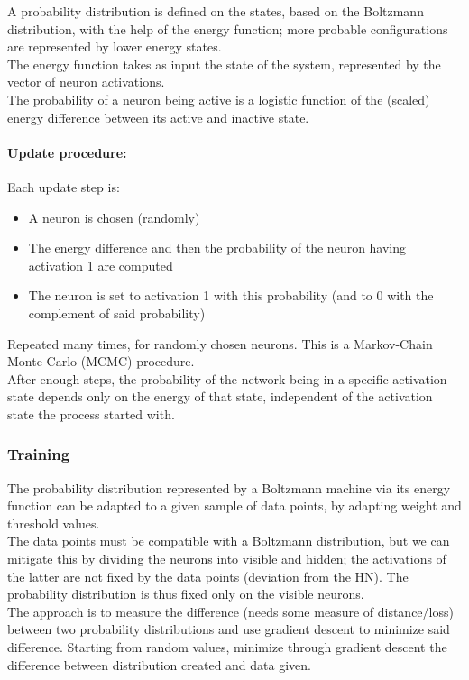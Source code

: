 A probability distribution is defined on the states, based on the Boltzmann distribution, with the help of the energy function; more probable configurations are represented by lower energy states.\\
The energy function takes as input the state of the system, represented by the vector of neuron activations.\\
The probability of a neuron being active is a logistic function of the (scaled) energy difference between its active and inactive state.\\

\paragraph{Update procedure:} Each update step is:
\begin{itemize}
	\item A neuron is chosen (randomly)
	\item The energy difference and then the probability of the neuron having activation 1 are computed
	\item The neuron is set to activation 1 with this probability (and to 0 with the complement of said probability)
\end{itemize}
Repeated many times, for randomly chosen neurons. This is a Markov-Chain Monte Carlo (MCMC) procedure.\\

After enough steps, the probability of the network being in a specific activation state depends only on the energy of that state, independent of the activation state the process started with.\\

\subsubsection{Training}
The probability distribution represented by a Boltzmann machine via its energy function can be adapted to a given sample of data points, by adapting weight and threshold values.\\
The data points must be compatible with a Boltzmann distribution, but we can mitigate this by dividing the neurons into visible and hidden; the activations of the latter are not fixed by the data points (deviation from the HN). The probability distribution is thus fixed only on the visible neurons.\\

The approach is to measure the difference (needs some measure of distance/loss) between two probability distributions and use gradient descent to minimize said difference. Starting from random values, minimize through gradient descent the difference between distribution created and data given.\\

